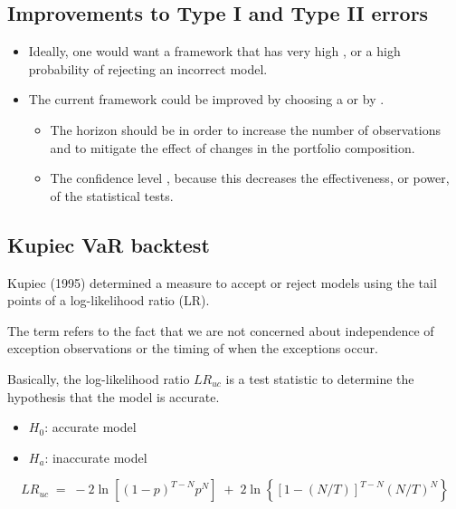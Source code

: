 \subsection{Improvements to Type I and Type II errors}
\begin{itemize}
\item Ideally, one would want a framework that has very high , or a high probability
      of rejecting an incorrect model.
\item The current framework could be improved by choosing a  or
      by .
      \begin{itemize}
      \item The horizon should be  in order to increase the number of
            observations and to mitigate the effect of changes in the portfolio composition.
      \item The confidence level , because this decreases the
            effectiveness, or power, of the statistical tests.
      \end{itemize}
\end{itemize}

\subsection{Kupiec VaR backtest}

 Kupiec (1995) determined a measure to accept or reject models
using the tail points of a log-likelihood ratio (LR).

The term  refers to the fact that we are not concerned about
independence of exception observations or the timing of when the exceptions occur.

Basically, the log-likelihood ratio $LR_{uc}$ is a test statistic to determine the hypothesis
that the model is accurate.

\begin{itemize}
\item $H_0$: accurate model
\item $H_a$: inaccurate model
\end{itemize}

\begin{mrfmlbox}
\[ LR_{uc} \;=\; -2\ln\!\left[ (1-p)^{T-N} p^{N} \right]
   \;+\; 2\ln\!\left\{ \left[ 1 - (N/T) \right]^{T-N} (N/T)^{N} \right\} \]
\end{mrfmlbox}

